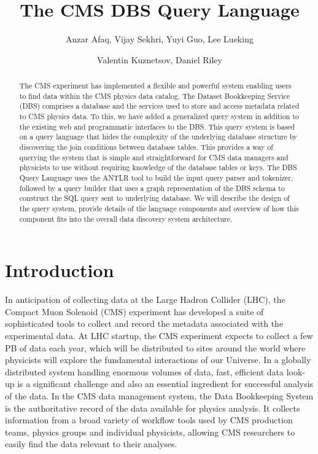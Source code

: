 \documentclass[a4paper]{jpconf}
\begin{document}
\title{The CMS DBS Query Language}

\author{Anzar Afaq, Vijay Sekhri, Yuyi Guo, Lee Lueking}
\address{Fermilab, Batavia, Illinois, USA}

\author{Valentin Kuznetsov, Daniel Riley}
\address{Cornell University, Ithaca, New York, USA}

\begin{abstract}
The CMS experiment has implemented a flexible and 
powerful system enabling users to find data within 
the CMS physics data catalog. The Dataset Bookkeeping 
Service (DBS) comprises a database and the services 
used to store and access metadata related to CMS physics 
data.  To this, we have added a generalized query system
in addition to the existing web and programmatic interfaces to the DBS.
This query system is based on a query language that hides the 
complexity of the underlying database structure by discovering the join conditions between
database tables. This provides 
a way of querying the system that is simple and straightforward for 
CMS data managers and physicists to use without requiring knowledge of the database
tables or keys. The DBS Query Language 
uses the ANTLR tool to build the input query parser and tokenizer, 
followed by a query builder that uses a graph representation of the 
DBS schema to construct the SQL query sent to underlying database. 
We will describe the design of the query system, provide 
details of the language components
and overview of how this component fits into the overall data 
discovery system architecture.
\end{abstract}

\section{Introduction}

In anticipation of collecting data at the Large Hadron Collider (LHC),
the Compact Muon Solenoid (CMS) experiment has
developed a suite of sophisticated tools
to collect and record the metadata associated with the experimental data. At
LHC startup, the CMS experiment expects to collect a few
PB of data each year, which will be distributed to sites
around the world where physicists will explore the fundamental
interactions of our Universe. In a globally distributed system handling enormous volumes of data,
fast, efficient data look-up is a significant
challenge and also an essential ingredient for successful
analysis of the data. In the CMS data management system, the Data Bookkeeping
System\cite{DBS} is the authoritative record of
the data available for physics analysis. It collects
information from a broad variety of workflow tools used by CMS production teams, physics groups and individual physicists, allowing
CMS researchers to easily find the data relevant to their analyses.
\end{document}
